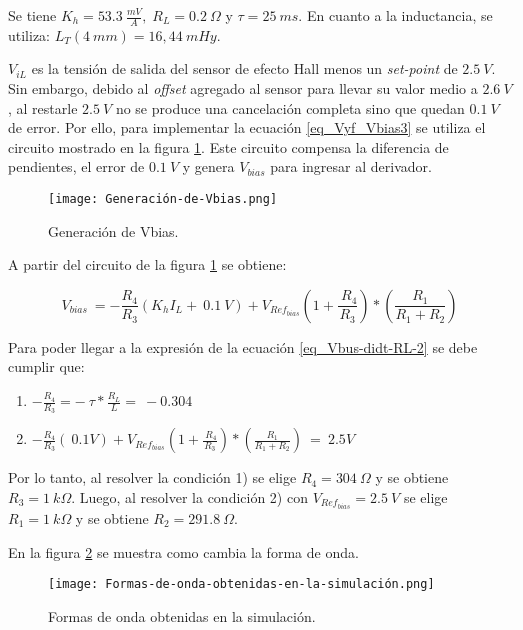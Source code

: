 \noindent Se tiene $K_h = 53.3\:\frac{mV}{A},\; R_L = 0.2\:\Omega$ y $\tau  = 25 \:ms$. En cuanto a la inductancia, se utiliza:  $L_T(4\:mm) = 16,44\:mHy$.

\noindent $V_{iL}$ es la tensi\'{o}n de salida del sensor de efecto Hall menos un \textsl{set-point} de $2.5\:V$. Sin embargo, debido al \textsl{offset} agregado al sensor para llevar su valor medio a $2.6\:V$, al restarle $2.5\:V$ no se produce una cancelaci\'{o}n completa sino que quedan $0.1\:V$ de error. Por ello, para implementar la ecuaci\'{o}n  \ref{eq_Vyf_Vbias3} se utiliza el circuito mostrado en la figura \ref{fig:img_Generación_de_Vbias}. Este circuito compensa la diferencia de pendientes, el error de $0.1\:V$ y genera $V_{bias}$ para ingresar al derivador.

\begin{figure}[H]
	\centering
	\texttt{[image: Generación-de-Vbias.png]}
	\caption{Generación de Vbias.}
	\label{fig:img_Generación_de_Vbias}
\end{figure}

\noindent A partir del circuito de la figura \ref{fig:img_Generación_de_Vbias} se obtiene:

\begin{equation} \label{eq_Vyf-Vbias3}
	V_{bias}\ =-\frac{R_4}{R_3}(K_hI_L+\ 0.1\:V)+V_{Ref_{bias}}(1+\frac{\ R_4}{R_3})*(\frac{R_1}{R_1+R_2})
\end{equation}

\noindent Para poder llegar a la expresi\'{o}n de la ecuaci\'{o}n \ref{eq_Vbus-didt-RL-2} se debe cumplir que:

\begin{enumerate}
	\item  $-\frac{R_4}{R_3}=-\ \tau *\frac{R_L}{L}=\ -0.304$  
	
	\item  $-\frac{R_4}{R_3}(\ 0.1V)+V_{Ref_{bias}}(1+\frac{\ R_4}{R_3})*(\frac{R_1}{R_1+R_2})\ =\ 2.5V$     
\end{enumerate}

\noindent Por lo tanto, al resolver la condici\'{o}n 1) se elige $R_4 = 304\: \Omega$ y se obtiene $R_3=1\:k\Omega$. Luego, al resolver la condici\'{o}n 2) con $V_{Ref_{bias}}=2.5\:V$ se elige $R_1=1\:k\Omega$ y se obtiene $R_{2}=291.8\:\Omega$.

\noindent En la figura \ref{fig:img_Formas_de_onda_obtenidas_en_la_simulación} se muestra como cambia la forma de onda.

\begin{figure}[H]
	\centering
	\texttt{[image: Formas-de-onda-obtenidas-en-la-simulación.png]}
	\caption{Formas de onda obtenidas en la simulación.}
	\label{fig:img_Formas_de_onda_obtenidas_en_la_simulación}
\end{figure}

